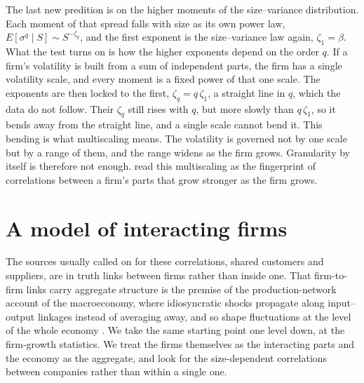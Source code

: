 The last new predition is on the higher moments of the size--variance distribution. Each moment
of that spread falls with size as its own power law, $E[\sigma^q \mid S] \sim S^{-\zeta_q}$, and
the first exponent is the size--variance law again, $\zeta_1 = \beta$. What the test turns on is
how the higher exponents depend on the order $q$. If a firm's volatility is built from a sum of
independent parts, the firm has a single volatility scale, and every moment is a fixed power of
that one scale. The exponents are then locked to the first, $\zeta_q = q\,\zeta_1$, a straight
line in $q$, which the data do not follow. Their $\zeta_q$ still rises with $q$, but more slowly
than $q\,\zeta_1$, so it bends away from the straight line, and a single scale cannot bend it.
This bending is what multiscaling means. The volatility is governed not by one scale but by a
range of them, and the range widens as the firm grows. Granularity by itself is therefore not
enough. \citet{moran2024} read this multiscaling as the fingerprint of correlations between a
firm's parts that grow stronger as the firm grows.

\section{A model of interacting firms}
\label{sec:intro-move}

The sources usually called on for these correlations, shared customers and suppliers, are in
truth links between firms rather than inside one. That firm-to-firm links carry aggregate
structure is the premise of the production-network account of the macroeconomy, where
idiosyncratic shocks propagate along input--output linkages instead of averaging away, and so
shape fluctuations at the level of the whole economy \citep{acemoglu2012, carvalho2019}. We take
the same starting point one level down, at the firm-growth statistics. We treat the firms
themselves as the interacting parts and the economy as the aggregate, and look for the
size-dependent correlations between companies rather than within a single one.

